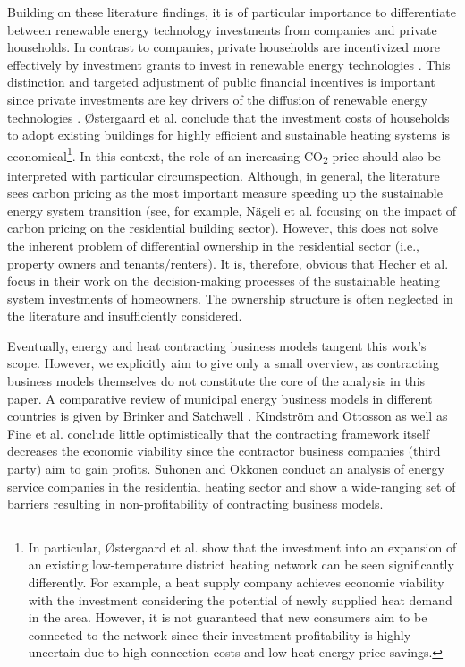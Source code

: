 Building on these literature findings, it is of particular importance to differentiate between renewable energy technology investments from companies and private households. In contrast to companies, private households are incentivized more effectively by investment grants to invest in renewable energy technologies \cite{roth2020impact}. This distinction and targeted adjustment of public financial incentives is important since private investments are key drivers of the diffusion of renewable energy technologies \cite{wustenhagen2012strategic}. {\O}stergaard et al. \cite{ostergaard2019costs} conclude that the investment costs of households to adopt existing buildings for highly efficient and sustainable heating systems is economical\footnote{In particular, {\O}stergaard et al. \cite{ostergaard2019costs} show that the investment into an expansion of an existing low-temperature district heating network can be seen significantly differently. For example, a heat supply company achieves economic viability with the investment considering the potential of newly supplied heat demand in the area. However, it is not guaranteed that new consumers aim to be connected to the network since their investment profitability is highly uncertain due to high connection costs and low heat energy price savings.}. In this context, the role of an increasing CO\textsubscript{2} price should also be interpreted with particular circumspection. Although, in general, the literature sees carbon pricing as the most important measure speeding up the sustainable energy system transition (see, for example, Nägeli et al. \cite{nageli2020policies} focusing on the impact of carbon pricing on the residential building sector). However, this does not solve the inherent problem of differential ownership in the residential sector (i.e., property owners and tenants/renters). It is, therefore, obvious that Hecher et al. \cite{hecher2017trigger} focus in their work on the decision-making processes of the sustainable heating system investments of homeowners. The ownership structure is often neglected in the literature and insufficiently considered.\vspace{0.5cm} 

Eventually, energy and heat contracting business models tangent this work's scope. However, we explicitly aim to give only a small overview, as contracting business models themselves do not constitute the core of the analysis in this paper. A comparative review of municipal energy business models in different countries is given by Brinker and Satchwell \cite{brinker2020comparative}. Kindström and Ottosson \cite{kindstrom2016local} as well as Fine et al. \cite{fina2020profitability} conclude little optimistically that the contracting framework itself decreases the economic viability since the contractor business companies (third party) aim to gain profits. Suhonen and Okkonen \cite{suhonen2013energy} conduct an analysis of energy service companies in the residential heating sector and show a wide-ranging set of barriers resulting in non-profitability of contracting business models.

